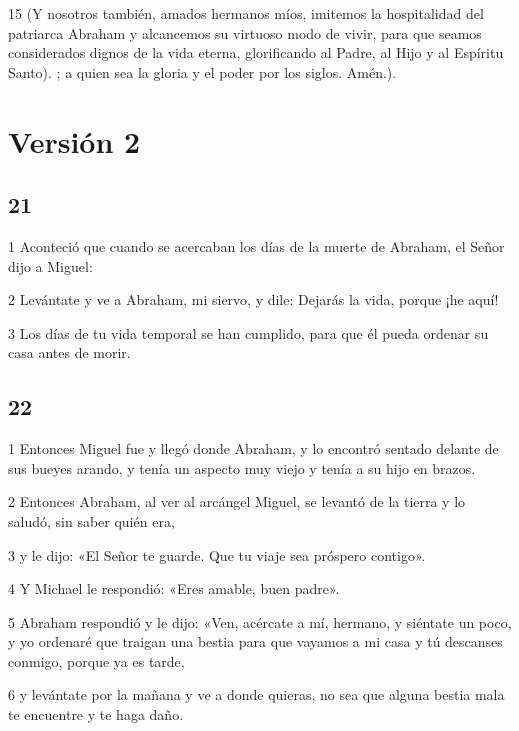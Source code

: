 \par 15 (Y nosotros también, amados hermanos míos, imitemos la hospitalidad del patriarca Abraham y alcancemos su virtuoso modo de vivir, para que seamos considerados dignos de la vida eterna, glorificando al Padre, al Hijo y al Espíritu Santo). ; a quien sea la gloria y el poder por los siglos. Amén.).

\part{Versión 2}

\chapter{21}

\par 1 Aconteció que cuando se acercaban los días de la muerte de Abraham, el Señor dijo a Miguel:

\par 2 Levántate y ve a Abraham, mi siervo, y dile: Dejarás la vida, porque ¡he aquí!

\par 3 Los días de tu vida temporal se han cumplido, para que él pueda ordenar su casa antes de morir.

\chapter{22}

\par 1 Entonces Miguel fue y llegó donde Abraham, y lo encontró sentado delante de sus bueyes arando, y tenía un aspecto muy viejo y tenía a su hijo en brazos.

\par 2 Entonces Abraham, al ver al arcángel Miguel, se levantó de la tierra y lo saludó, sin saber quién era,

\par 3 y le dijo: «El Señor te guarde. Que tu viaje sea próspero contigo».

\par 4 Y Michael le respondió: «Eres amable, buen padre».

\par 5 Abraham respondió y le dijo: «Ven, acércate a mí, hermano, y siéntate un poco, y yo ordenaré que traigan una bestia para que vayamos a mi casa y tú descanses conmigo, porque ya es tarde,

\par 6 y levántate por la mañana y ve a donde quieras, no sea que alguna bestia mala te encuentre y te haga daño.

